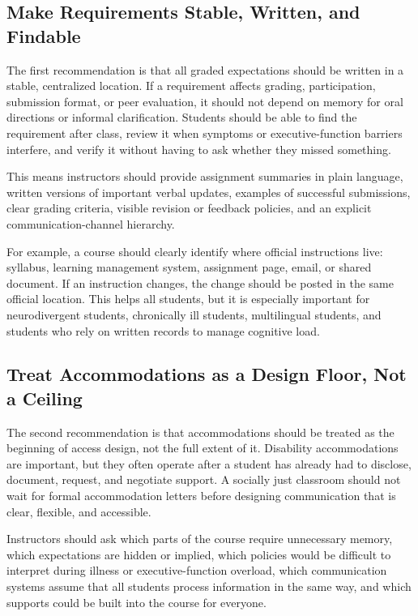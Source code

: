 \documentclass[12pt]{article}
\begin{document}
\subsection*{Make Requirements Stable, Written, and Findable}

The first recommendation is that all graded expectations should be written in a stable, centralized location. If a requirement affects grading, participation, submission format, or peer evaluation, it should not depend on memory for oral directions or informal clarification. Students should be able to find the requirement after class, review it when symptoms or executive-function barriers interfere, and verify it without having to ask whether they missed something.

This means instructors should provide assignment summaries in plain language, written versions of important verbal updates, examples of successful submissions, clear grading criteria, visible revision or feedback policies, and an explicit communication-channel hierarchy.

For example, a course should clearly identify where official instructions live: syllabus, learning management system, assignment page, email, or shared document. If an instruction changes, the change should be posted in the same official location. This helps all students, but it is especially important for neurodivergent students, chronically ill students, multilingual students, and students who rely on written records to manage cognitive load.

\subsection*{Treat Accommodations as a Design Floor, Not a Ceiling}

The second recommendation is that accommodations should be treated as the beginning of access design, not the full extent of it. Disability accommodations are important, but they often operate after a student has already had to disclose, document, request, and negotiate support. A socially just classroom should not wait for formal accommodation letters before designing communication that is clear, flexible, and accessible.

Instructors should ask which parts of the course require unnecessary memory, which expectations are hidden or implied, which policies would be difficult to interpret during illness or executive-function overload, which communication systems assume that all students process information in the same way, and which supports could be built into the course for everyone.
\end{document}
